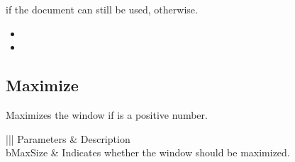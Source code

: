 \documentclass[letterpaper,12pt,english,openany,oneside]{sphinxmanual}
\begin{document}

 if the document can still be used,  otherwise.

\label{\detokenize{IAC_API_OLE_Objects:related-methods-35}}
\begin{itemize}
\item {} 
 

\item {} 
 

\end{itemize}




\subsection{Maximize}
\label{\detokenize{IAC_API_OLE_Objects:maximize-1}}\label{\detokenize{IAC_API_OLE_Objects:id3}}
Maximizes the window if  is a positive number.


\begin{sphinxVerbatim}[commandchars=\\\{\}]
  
\end{sphinxVerbatim}
\label{\detokenize{IAC_API_OLE_Objects:parameters-21}}


\begin{savenotes}\sphinxattablestart
\centering
{}\label{\detokenize{IAC_API_OLE_Objects:section-24}}\nobreak
\begin{tabular}[t]{|||}
\hline
\sphinxstyletheadfamily 
Parameters
&\sphinxstyletheadfamily 
Description
\\
\hline
bMaxSize
&
Indicates whether the window should be maximized.
\\
\hline
\end{tabular}
\par
\sphinxattableend\end{savenotes}

\end{document}
